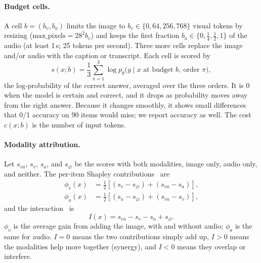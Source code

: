 \documentclass{article}
\begin{document}
\paragraph{Budget cells.} A cell $b=(b_v,b_a)$ limits the image to $b_v\in\{0,64,256,768\}$
visual tokens by resizing ($\text{max\_pixels}=28^2 b_v$) and keeps the first
fraction $b_a\in\{0,\tfrac14,\tfrac12,1\}$ of the audio (at least 1\,s; 25 tokens per
second). Three more cells replace the image and/or audio with the caption or
transcript. Each cell is scored by
\begin{equation}
s(x;b)=\frac{1}{3}\sum_{\pi=1}^{3}\log p_\theta\big(y\mid x\text{ at budget }b,\ \text{order }\pi\big),
\end{equation}
the log-probability of the correct answer, averaged over the three orders. It is 0
when the model is certain and correct, and it drops as probability moves away from
the right answer. Because it changes smoothly, it shows small differences that 0/1
accuracy on 90 items would miss; we report accuracy as well. The cost $c(x;b)$ is
the number of input tokens.

\paragraph{Modality attribution.} Let $s_{va}$, $s_v$, $s_a$, and $s_{\varnothing}$
be the scores with both modalities, image only, audio only, and neither. The
per-item Shapley contributions~\citep{shapley1953value,lundberg2017shap} are
\begin{align}
\phi_v(x)
&=
\frac{1}{2}
\left[
(s_v-s_{\varnothing})
+
(s_{va}-s_a)
\right],\\
\phi_a(x)
&=
\frac{1}{2}
\left[
(s_a-s_{\varnothing})
+
(s_{va}-s_v)
\right],
\end{align}
and the interaction~\citep{hessel2020emap} is
\begin{equation}
I(x)=s_{va}-s_v-s_a+s_{\varnothing}.
\end{equation}
$\phi_v$ is the average gain from adding the image, with and without audio; $\phi_a$
is the same for audio. $I=0$ means the two contributions simply add up, $I>0$ means
the modalities help more together (synergy), and $I<0$ means they overlap or
interfere.
\end{document}
